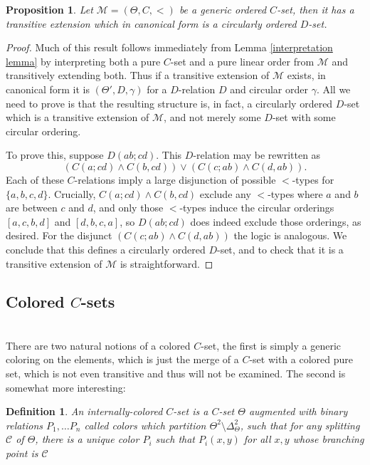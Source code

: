 \documentclass{amsart}
\newtheorem{definition}[theorem]{Definition}
\newtheorem{proposition}[theorem]{Proposition}
\newcommand{\set}[1]{\{#1 \}}
\newcommand{\model}{\mathcal{M}}
\begin{document}
\begin{proposition}
    Let $\model = (\Theta, C, <)$ be a generic ordered $C$-set, then it has a transitive extension which in canonical form is a circularly ordered $D$-set.
\end{proposition}
\begin{proof}
    Much of this result follows immediately from Lemma \ref{interpretation lemma} by interpreting both a pure $C$-set and a pure linear order from $\model$ and transitively extending both. Thus if a transitive extension of $\model$ exists, in canonical form it is $(\Theta', D, \gamma)$ for a $D$-relation $D$ and circular order $\gamma$. All we need to prove is that the resulting structure is, in fact, a circularly ordered $D$-set which is a transitive extension of $\model$, and not merely some $D$-set with some circular ordering. 

    To prove this, suppose $D(ab;cd)$. This $D$-relation may be rewritten as
    $$(C(a;cd) \wedge C(b,cd)) \vee (C(c; ab) \wedge C(d, ab)).$$
    Each of these $C$-relations imply a large disjunction of possible $<$-types for $\set{a,b,c,d}$. Crucially, $C(a;cd) \wedge C(b,cd)$ exclude any $<$-types where $a$ and $b$ are between $c$ and $d$, and only those $<$-types induce the circular orderings $[a,c,b,d]$ and $[d,b,c,a]$, so $D(ab;cd)$ does indeed exclude those orderings, as desired. For the disjunct $(C(c; ab) \wedge C(d, ab))$ the logic is analogous. We conclude that this defines a circularly ordered $D$-set, and to check that it is a transitive extension of $\model$ is straightforward.
    
\end{proof}


\subsection{Colored $C$-sets}\hfill\\

There are two natural notions of a colored $C$-set, the first is simply a generic coloring on the elements, which is just the merge of a $C$-set with a colored pure set, which is not even transitive and thus will not be examined. The second is somewhat more interesting:

\begin{definition}
    An \emph{internally-colored $C$-set} is a $C$-set $\Theta$ augmented with binary relations $P_1, \dots P_n$ called colors which partition $\Theta^2 \setminus \Delta_\Theta^2$, such that for any splitting $\mathcal{C}$ of $\Theta$, there is a unique color $P_i$ such that $P_i(x,y)$ for all $x,y$ whose branching point is $\mathcal{C}$
\end{definition}
\end{document}
